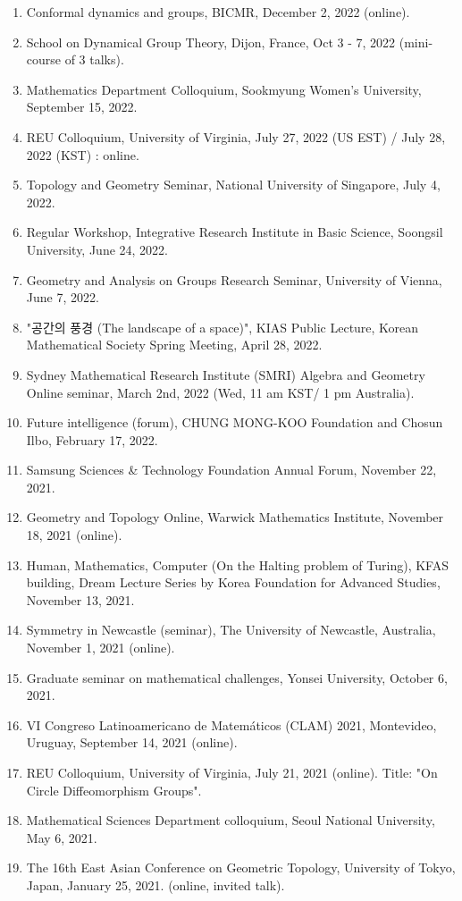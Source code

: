 \documentclass[11pt,a4paper]{article}
\begin{document}
\begin{enumerate}[leftmargin=1.5em, label=\arabic*.]
\item Conformal dynamics and groups, BICMR, December 2, 2022 (online).
\item School on Dynamical Group Theory, Dijon, France, Oct 3 - 7, 2022 (mini-course of 3 talks).
\item Mathematics Department Colloquium, Sookmyung Women's University, September 15, 2022.
\item REU Colloquium, University of Virginia, July 27, 2022 (US EST) / July 28, 2022 (KST) : online.
\item Topology and Geometry Seminar, National University of Singapore, July 4, 2022.
\item Regular Workshop, Integrative Research Institute in Basic Science, Soongsil University, June 24, 2022.
\item Geometry and Analysis on Groups Research Seminar, University of Vienna, June 7, 2022.
\item "공간의 풍경 (The landscape of a space)", KIAS Public Lecture, Korean Mathematical Society Spring Meeting, April 28, 2022.
\item Sydney Mathematical Research Institute (SMRI) Algebra and Geometry Online seminar, March 2nd, 2022 (Wed, 11 am KST/ 1 pm Australia).
\item Future intelligence (forum), CHUNG MONG-KOO Foundation and Chosun Ilbo, February 17, 2022.
\item Samsung Sciences \& Technology Foundation Annual Forum, November 22, 2021.
\item Geometry and Topology Online, Warwick Mathematics Institute, November 18, 2021 (online).
\item Human, Mathematics, Computer (On the Halting problem of Turing), KFAS building, Dream Lecture Series by Korea Foundation for Advanced Studies, November 13, 2021.
\item Symmetry in Newcastle (seminar), The University of Newcastle, Australia, November 1, 2021 (online).
\item Graduate seminar on mathematical challenges, Yonsei University, October 6, 2021.
\item VI Congreso Latinoamericano de Matemáticos (CLAM) 2021, Montevideo, Uruguay, September 14, 2021 (online).
\item REU Colloquium, University of Virginia, July 21, 2021 (online). Title: "On Circle Diffeomorphism Groups".
\item Mathematical Sciences Department colloquium, Seoul National University, May 6, 2021.
\item The 16th East Asian Conference on Geometric Topology, University of Tokyo, Japan, January 25, 2021. (online, invited talk).

\end{enumerate}
\end{document}

